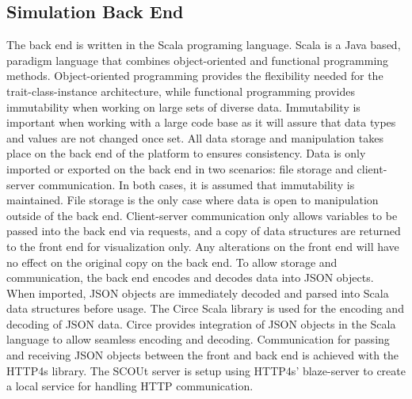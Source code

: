 \subsection{Simulation Back End} \label{subsec:back_end}
The back end is written in the Scala programing language.
Scala is a Java based, paradigm language that combines object-oriented and functional programming methods.
Object-oriented programming provides the flexibility needed for the trait-class-instance architecture, while functional programming provides immutability when working on large sets of diverse data.
Immutability is important when working with a large code base as it will assure that data types and values are not changed once set.
All data storage and manipulation takes place on the back end of the platform to ensures consistency.
Data is only imported or exported on the back end in two scenarios: file storage and client-server communication.
In both cases, it is assumed that immutability is maintained.
File storage is the only case where data is open to manipulation outside of the back end.
Client-server communication only allows variables to be passed into the back end via requests, and a copy of data structures are returned to the front end for visualization only.
Any alterations on the front end will have no effect on the original copy on the back end.
To allow storage and communication, the back end encodes and decodes data into JSON objects.
When imported, JSON objects are immediately decoded and parsed into Scala data structures before usage.
The Circe Scala library  is used for the encoding and decoding of JSON data.
Circe provides integration of JSON objects in the Scala language to allow seamless encoding and decoding.
Communication for passing and receiving JSON objects between the front and back end is achieved with the HTTP4s library. 
The SCOUt server is setup using HTTP4s' blaze-server to create a local service for handling HTTP communication.


